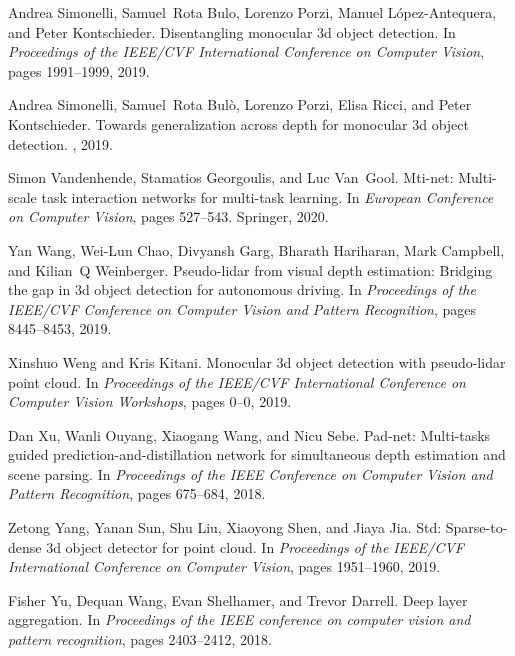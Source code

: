 \documentclass[10pt,twocolumn,letterpaper]{article}
\begin{document}
{\begin{thebibliography}{10}
Andrea Simonelli, Samuel~Rota Bulo, Lorenzo Porzi, Manuel L{\'o}pez-Antequera,
  and Peter Kontschieder.
\newblock Disentangling monocular 3d object detection.
\newblock In {\em Proceedings of the IEEE/CVF International Conference on
  Computer Vision}, pages 1991--1999, 2019.

Andrea Simonelli, Samuel~Rota Bul{\`o}, Lorenzo Porzi, Elisa Ricci, and Peter
  Kontschieder.
\newblock Towards generalization across depth for monocular 3d object
  detection.
, 2019.

Simon Vandenhende, Stamatios Georgoulis, and Luc Van~Gool.
\newblock Mti-net: Multi-scale task interaction networks for multi-task
  learning.
\newblock In {\em European Conference on Computer Vision}, pages 527--543.
  Springer, 2020.

Yan Wang, Wei-Lun Chao, Divyansh Garg, Bharath Hariharan, Mark Campbell, and
  Kilian~Q Weinberger.
\newblock Pseudo-lidar from visual depth estimation: Bridging the gap in 3d
  object detection for autonomous driving.
\newblock In {\em Proceedings of the IEEE/CVF Conference on Computer Vision and
  Pattern Recognition}, pages 8445--8453, 2019.

Xinshuo Weng and Kris Kitani.
\newblock Monocular 3d object detection with pseudo-lidar point cloud.
\newblock In {\em Proceedings of the IEEE/CVF International Conference on
  Computer Vision Workshops}, pages 0--0, 2019.

Dan Xu, Wanli Ouyang, Xiaogang Wang, and Nicu Sebe.
\newblock Pad-net: Multi-tasks guided prediction-and-distillation network for
  simultaneous depth estimation and scene parsing.
\newblock In {\em Proceedings of the IEEE Conference on Computer Vision and
  Pattern Recognition}, pages 675--684, 2018.

Zetong Yang, Yanan Sun, Shu Liu, Xiaoyong Shen, and Jiaya Jia.
\newblock Std: Sparse-to-dense 3d object detector for point cloud.
\newblock In {\em Proceedings of the IEEE/CVF International Conference on
  Computer Vision}, pages 1951--1960, 2019.

Fisher Yu, Dequan Wang, Evan Shelhamer, and Trevor Darrell.
\newblock Deep layer aggregation.
\newblock In {\em Proceedings of the IEEE conference on computer vision and
  pattern recognition}, pages 2403--2412, 2018.


\end{thebibliography}}
\end{document}

